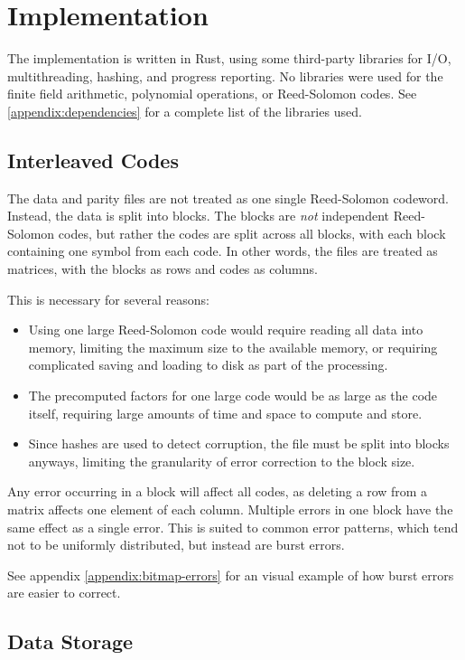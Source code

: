 \chapter{Implementation}

The implementation is written in Rust, using some third-party libraries for I/O, multithreading, hashing, and progress reporting. No libraries were used for the finite field arithmetic, polynomial operations, or Reed-Solomon codes.
See \ref{appendix:dependencies} for a complete list of the libraries used.

\section{Interleaved Codes}

The data and parity files are not treated as one single Reed-Solomon codeword.
Instead, the data is split into blocks. The blocks are \textit{not} independent Reed-Solomon codes, but rather the codes are split across all blocks, with each block containing one symbol from each code.
In other words, the files are treated as matrices, with the blocks as rows and codes as columns.

This is necessary for several reasons:
\begin{itemize}
    \item Using one large Reed-Solomon code would require reading all data into memory, limiting the maximum size to the available memory, or requiring complicated saving and loading to disk as part of the processing.
    \item The precomputed factors for one large code would be as large as the code itself, requiring large amounts of time and space to compute and store.
    \item Since hashes are used to detect corruption, the file must be split into blocks anyways, limiting the granularity of error correction to the block size.
\end{itemize}

Any error occurring in a block will affect all codes, as deleting a row from a matrix affects one element of each column.
Multiple errors in one block have the same effect as a single error. This is suited to common error patterns, which tend not to be uniformly distributed, but instead are burst errors.

See appendix \ref{appendix:bitmap-errors} for an visual example of how burst errors are easier to correct.

\section{Data Storage}

